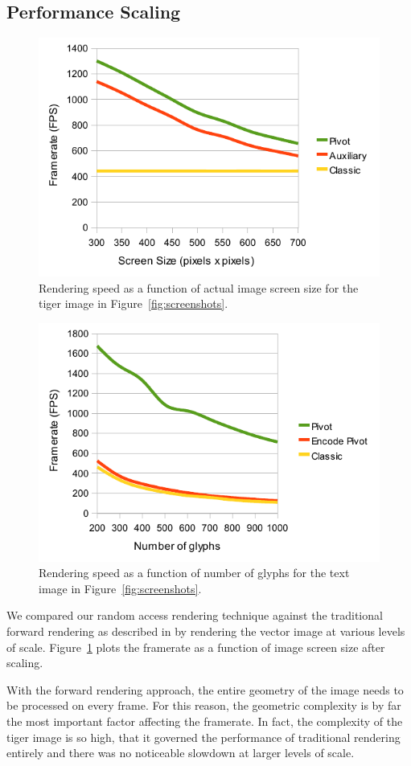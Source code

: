 \documentclass[11pt,a4paper,twoside]{article}
\begin{document}
\subsection {Performance Scaling}

\begin {figure} [h]
	\centering
	\includegraphics[width=0.6\columnwidth] {figures/graph_size_render}
	\caption {Rendering speed as a function of actual image screen size for the tiger image in Figure~\ref{fig:screenshots}.}
	\label {fig:graph_size_render}
\end {figure}

\begin {figure} [h]
	\centering
	\includegraphics[width=0.6\columnwidth] {figures/graph_glyphs_render}
	\caption {Rendering speed as a function of number of glyphs for the text image in Figure~\ref{fig:screenshots}.}
	\label {fig:graph_glyphs_render}
\end {figure}


We compared our random access rendering technique against the traditional forward rendering as described in \cite{Kokojima06} by rendering the vector image at various levels of scale. Figure~\ref{fig:graph_size_render} plots the framerate as a function of image screen size after scaling.

With the forward rendering approach, the entire geometry of the image needs to be processed on every frame. For this reason, the geometric complexity is by far the most important factor affecting the framerate. In fact, the complexity of the tiger image is so high, that it governed the performance of traditional rendering entirely and there was no noticeable slowdown at larger levels of scale.
\end{document}
